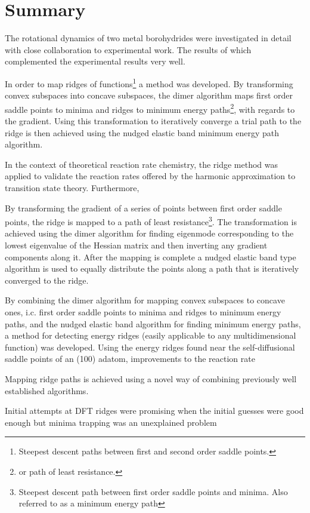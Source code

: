 \chapter{Summary}
\label{chap:summary}

The rotational dynamics of two metal  borohydrides were investigated in detail with close collaboration to experimental work.
The results of which complemented the experimental results very well.
\expand

In order to map ridges of functions\footnote{Steepest descent paths between first and second order saddle points.} a method was developed.
By transforming convex subspaces into concave subspaces, the dimer algorithm maps first order saddle points to minima and ridges to minimum energy paths\footnote{or path of least resistance.}, with regards to the gradient.
Using this transformation to iteratively converge a trial path to the ridge is then achieved using the nudged elastic band minimum energy path algorithm.

In the context of theoretical reaction rate chemistry, the ridge method was applied to validate the reaction rates offered by the harmonic approximation to transition state theory.
Furthermore, 


By transforming the gradient of a series of points between first order saddle points, the ridge is mapped to a path of least resistance\footnote{Steepest descent path between first order saddle points and minima. Also referred to as a minimum energy path}.
The transformation is achieved using the dimer algorithm for finding eigenmode corresponding to the lowest eigenvalue of the Hessian matrix and then inverting any gradient components along it.
After the mapping is complete a nudged elastic band type algorithm is used to equally distribute the points along a path that is iteratively converged to the ridge.






By combining the dimer algorithm for mapping convex subspaces to concave ones, i.c. first order saddle points to minima and ridges to minimum energy paths, and the nudged elastic band algorithm for finding minimum energy paths, a method for detecting energy ridges (easily applicable to any multidimensional function) was developed.
Using the energy ridges found near the self-diffusional saddle points of an (100) adatom, improvements to the reaction rate \expand


\bit
\item Mapping ridge paths is achieved using a novel way of combining previously well established  algorithms.
\item \expand
\item Initial attempts at DFT ridges were promising when the initial guesses were good enough but minima trapping was an unexplained problem
\eit

\placeholder







